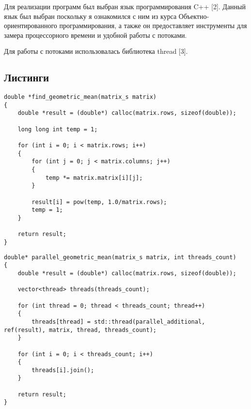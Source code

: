 Для реализации программ был выбран язык программирования C++ [2]. Данный язык был выбран поскольку я ознакомился с ним из курса Объектно-ориентированного программирования, а также он предоставляет инструменты для замера процессорного времени и удобной работы с потоками. 

Для работы с потоками использовалась библиотека thread [3]. 

\subsection{Листинги}

\begin{center}
\captionsetup{justification=raggedright,singlelinecheck=off}
\begin{lstlisting}[caption=Функция последовательного нахождения среднего геометрического строк матрицы, label=list:canon, language={}]
double *find_geometric_mean(matrix_s matrix)
{
    double *result = (double*) calloc(matrix.rows, sizeof(double));

    long long int temp = 1;

    for (int i = 0; i < matrix.rows; i++)
    {
        for (int j = 0; j < matrix.columns; j++)
        {
            temp *= matrix.matrix[i][j];
        }

        result[i] = pow(temp, 1.0/matrix.rows);
        temp = 1;
    }

    return result;
}
\end{lstlisting}
\end{center}

\begin{center}
\captionsetup{justification=raggedright,singlelinecheck=off}
\begin{lstlisting}[caption=Функция создания потоков, label=list:vinograd, language={}]
double* parallel_geometric_mean(matrix_s matrix, int threads_count)
{
    double *result = (double*) calloc(matrix.rows, sizeof(double));

    vector<thread> threads(threads_count);

    for (int thread = 0; thread < threads_count; thread++)
    {
        threads[thread] = std::thread(parallel_additional, ref(result), matrix, thread, threads_count);
    }

    for (int i = 0; i < threads_count; i++)
    {
        threads[i].join();
    }

    return result;
}
\end{lstlisting}
\end{center}

